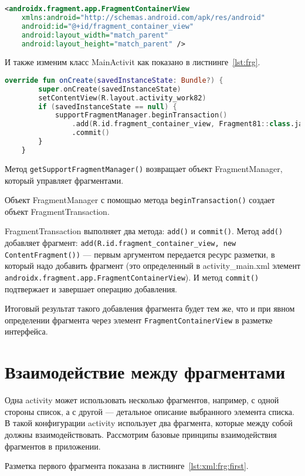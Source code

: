 \begin{lstlisting}[language=XML
	, caption=\leftline{}
	, label=lst:xml:frg:java
	]
<androidx.fragment.app.FragmentContainerView
	xmlns:android="http://schemas.android.com/apk/res/android"
	android:id="@+id/fragment_container_view"
	android:layout_width="match_parent"
	android:layout_height="match_parent" />
\end{lstlisting}

И также изменим класс MainActivit как показано
в листнинге~\ref{lst:frg}.

\begin{lstlisting}[language=Kotlin, caption=\leftline{}, label={lst:frg}]
override fun onCreate(savedInstanceState: Bundle?) {
        super.onCreate(savedInstanceState)
        setContentView(R.layout.activity_work82)
        if (savedInstanceState == null) {
            supportFragmentManager.beginTransaction()
                .add(R.id.fragment_container_view, Fragment81::class.java, null)
                .commit()
        }
    }
\end{lstlisting}


Метод \texttt{getSupportFragmentManager()} возвращает объект FragmentManager,
который управляет фрагментами.\par
Объект FragmentManager с помощью метода \texttt{beginTransaction()} создает
объект FragmentTransaction.\par
FragmentTransaction выполняет два метода: \texttt{add()} и \texttt{commit()}.
Метод \texttt{add()} добавляет фрагмент:
\texttt{add(R.id.fragment\_container\_view, new 
ContentFragment())} --- первым аргументом передается ресурс разметки, в
который надо добавить фрагмент (это определенный в activity\_main.xml
элемент \texttt{androidx.fragment.app.FragmentContainerView}).
И метод \texttt{commit()} подтвержает и завершает операцию добавления.\par
Итоговый результат такого добавления фрагмента будет тем же, что и при
явном определении фрагмента через элемент \texttt{FragmentContainerView} в
разметке интерфейса.

\section{Взаимодействие между фрагментами}
Одна activity может использовать несколько фрагментов, например, с одной
стороны список, а с другой --- детальное описание выбранного элемента
списка. В такой конфигурации activity использует два фрагмента, которые
между собой должны взаимодействовать. Рассмотрим базовые принципы
взаимодействия фрагментов в приложении.\par
Разметка первого фрагмента показана в листнинге~\ref{lst:xml:frg:first}.


